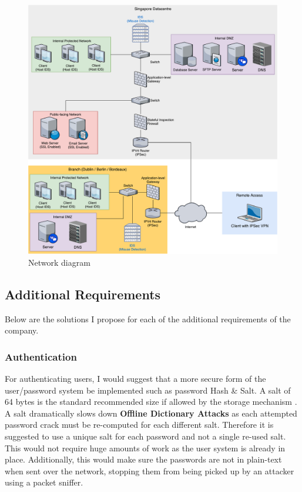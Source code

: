 \documentclass[11pt]{article}
\begin{document}
          \begin{figure}[h]
            \centering
            \includegraphics[width=13cm]{network-diagram.pdf}
            \caption{Network diagram}
            \label{fig:network-diagram}
          \end{figure}

      \subsection{Additional Requirements}
        Below are the solutions I propose for each of the additional requirements of the company.

        \subsubsection{Authentication} \label{auth}
          For authenticating users, I would suggest that a more secure form of the user/password system be implemented such as password Hash \& Salt. A salt of 64 bytes is the standard recommended size if allowed by the storage mechanism \citep{owaspSalt}. A salt dramatically slows down \textbf{Offline Dictionary Attacks} as each attempted password crack must be re-computed for each different salt. Therefore it is suggested to use a unique salt for each password and not a single re-used salt. This would not require huge amounts of work as the user system is already in place. Additionally, this would make sure the passwords are not in plain-text when sent over the network, stopping them from being picked up by an attacker using a packet sniffer.
\end{document}
